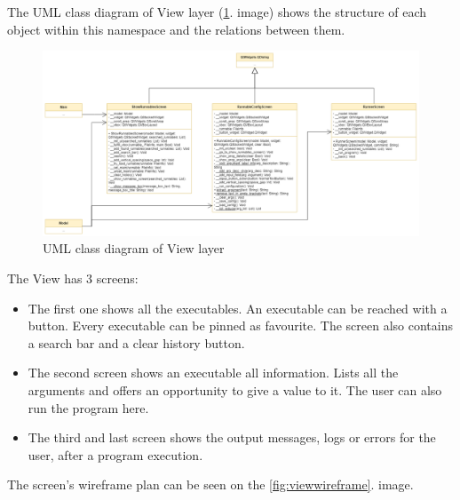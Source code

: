 \documentclass{article}
\begin{document}
\FloatBarrier

The UML class diagram of View layer (\ref{fig:umlview}. image) shows the structure of each object within this namespace and the relations between them.

\begin{figure}[h]
    \centering
    \includegraphics[width=1\linewidth]{img/class_diagram_view.drawio.png}
    \caption{UML class diagram of View layer}
    \label{fig:umlview}
\end{figure}

\FloatBarrier

The View has 3 screens:

\begin{itemize}
    \item The first one shows all the executables. An executable can be reached with a button. Every executable can be pinned as favourite. The screen also contains a search bar and a clear history button.
    \item The second screen shows an executable all information. Lists all the arguments and offers an opportunity to give a value to it. The user can also run the program here.
    \item The third and last screen shows the output messages, logs or errors for the user, after a program execution.
\end{itemize}

The screen's wireframe plan can be seen on the \ref{fig:viewwireframe}. image.
\end{document}

